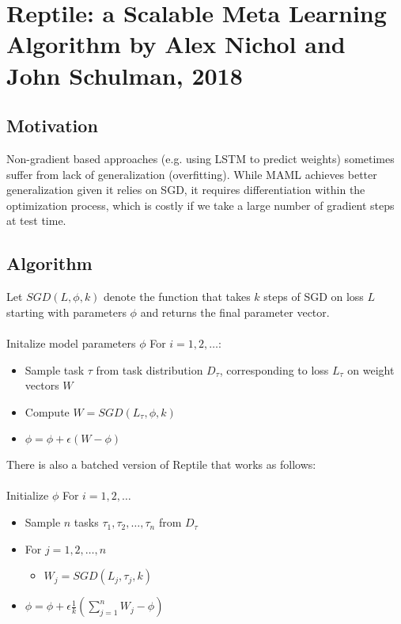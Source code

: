 \section{Reptile: a Scalable Meta Learning Algorithm by Alex Nichol and John Schulman, 2018}

\subsection{Motivation}

Non-gradient based approaches (e.g. using LSTM to predict weights) sometimes suffer from lack of generalization (overfitting).
While MAML achieves better generalization given it relies on SGD, it requires differentiation within the optimization process,
which is costly if we take a large number of gradient steps at test time. 

\subsection{Algorithm}
Let $SGD(L, \phi, k)$ denote the function that takes $k$ steps of SGD on loss $L$ starting with parameters 
$\phi$ and returns the final parameter vector. \\\\

Initalize model parameters $\phi$
For $i = 1, 2, \dots$:
\begin{itemize}
    \item Sample task $\tau$ from task distribution $D_{\tau}$, corresponding to loss $L_{\tau}$ on weight vectors $W$
    \item Compute $W = SGD(L_{\tau}, \phi, k)$
    \item $\phi = \phi + \epsilon (W - \phi)$
\end{itemize}

There is also a batched version of Reptile that works as follows: \\\\

Initialize $\phi$
For $i = 1, 2, \dots$
\begin{itemize}
    \item Sample $n$ tasks $\tau_1, \tau_2, \dots, \tau_n$ from $D_{\tau}$
    \item For $j = 1, 2, \dots, n$
    \begin{itemize}
        \item $W_j = SGD(L_j, \tau_j, k)$
    \end{itemize}
    \item $\phi = \phi + \epsilon \frac{1}{k}(\sum_{j = 1}^{n} W_j - \phi)$
\end{itemize}

